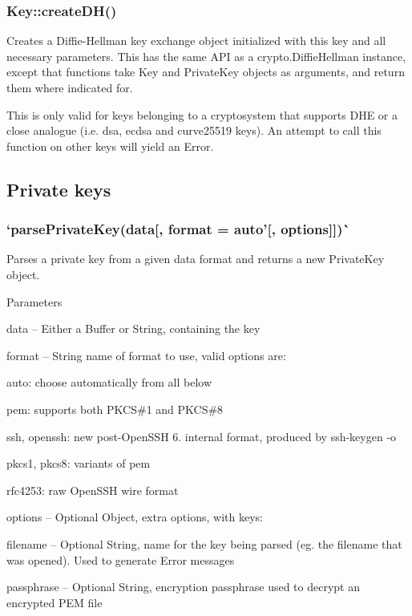 \subsubsection*{{\ttfamily Key\+::create\+D\+H()}}

Creates a Diffie-\/\+Hellman key exchange object initialized with this key and all necessary parameters. This has the same A\+PI as a {\ttfamily crypto.\+Diffie\+Hellman} instance, except that functions take {\ttfamily Key} and {\ttfamily Private\+Key} objects as arguments, and return them where indicated for.

This is only valid for keys belonging to a cryptosystem that supports D\+HE or a close analogue (i.\+e. {\ttfamily dsa}, {\ttfamily ecdsa} and {\ttfamily curve25519} keys). An attempt to call this function on other keys will yield an {\ttfamily Error}.

\subsection*{Private keys}

\subsubsection*{`parse\+Private\+Key(data\mbox{[}, format = \textquotesingle{}auto'\mbox{[}, options\mbox{]}\mbox{]})\`{}}

Parses a private key from a given data format and returns a new {\ttfamily Private\+Key} object.

Parameters


\begin{DoxyItemize}
\item {\ttfamily data} -- Either a Buffer or String, containing the key
\item {\ttfamily format} -- String name of format to use, valid options are\+:
\begin{DoxyItemize}
\item {\ttfamily auto}\+: choose automatically from all below
\item {\ttfamily pem}\+: supports both P\+K\+CS\#1 and P\+K\+CS\#8
\item {\ttfamily ssh}, {\ttfamily openssh}\+: new post-\/\+Open\+S\+SH 6. internal format, produced by {\ttfamily ssh-\/keygen -\/o}
\item {\ttfamily pkcs1}, {\ttfamily pkcs8}\+: variants of {\ttfamily pem}
\item {\ttfamily rfc4253}\+: raw Open\+S\+SH wire format
\end{DoxyItemize}
\item {\ttfamily options} -- Optional Object, extra options, with keys\+:
\begin{DoxyItemize}
\item {\ttfamily filename} -- Optional String, name for the key being parsed (eg. the filename that was opened). Used to generate Error messages
\item {\ttfamily passphrase} -- Optional String, encryption passphrase used to decrypt an encrypted P\+EM file
\end{DoxyItemize}
\end{DoxyItemize}

